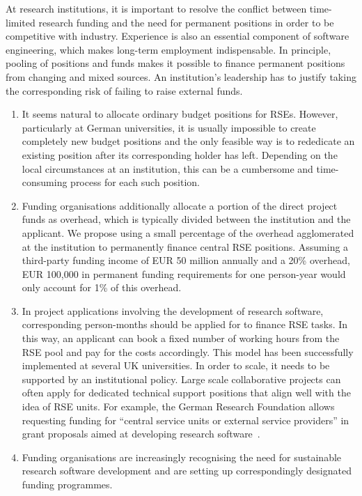 \documentclass[a4paper]{article}
\begin{document}
At research institutions, it is important to resolve the conflict between time-limited research funding and the need for permanent positions in order to be competitive with industry.
Experience is also an essential component of software engineering, which makes long-term employment indispensable.
In principle, pooling of positions and funds makes it possible to finance permanent positions from changing and mixed sources.
An institution’s leadership has to justify taking the corresponding risk of failing to raise external funds.
\begin{enumerate}
\item It seems natural to allocate ordinary budget positions for RSEs.
      However, particularly at German universities, it is usually impossible to create completely new budget positions and the only feasible way is to rededicate an existing position after its corresponding holder has left.
      Depending on the local circumstances at an institution, this can be a cumbersome and time-consuming process for each such position.
\item Funding organisations additionally allocate a portion of the direct project funds as overhead, which is typically divided between the institution and the applicant.
      We propose using a small percentage of the overhead agglomerated at the institution to permanently finance central RSE positions.
      Assuming a third-party funding income of EUR 50 million annually and a 20\% overhead, EUR 100,000 in permanent funding requirements for one person-year would only account for 1\% of this overhead.
\item In project applications involving the development of research software, corresponding person-months should be applied for to finance RSE tasks.
      In this way, an applicant can book a fixed number of working hours from the RSE pool and pay for the costs accordingly.
      This model has been successfully implemented at several UK universities.
      In order to scale, it needs to be supported by an institutional policy.
      Large scale collaborative projects can often apply for dedicated technical support positions that align well with the idea of RSE units.
      For example, the German Research Foundation allows requesting funding for “central service units or external service providers” in grant proposals aimed at developing research software~\autocite{katerbow_dfg_rse_2024}.
\item Funding organisations are increasingly recognising the need for sustainable research software
      development and are setting up correspondingly designated funding programmes.

\end{enumerate}
\end{document}
